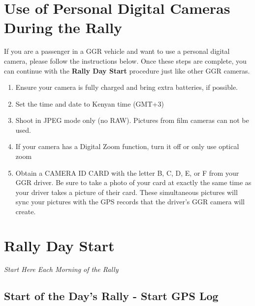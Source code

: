\section{Use of Personal Digital Cameras During the Rally}

If you are a passenger in a GGR vehicle and want to use a personal digital camera, please follow the instructions below.  Once these steps are complete, you can continue with the \textbf{Rally Day Start} procedure just like other GGR cameras.

\begin{enumerate}
    \item Ensure your camera is fully charged and bring extra batteries, if possible.
    \item Set the time and date to Kenyan time (GMT+3)
    \item Shoot in JPEG mode only (no RAW).  Pictures from film cameras can not be used.
    \item If your camera has a Digital Zoom function, turn it off or only use optical zoom
    \item Obtain a CAMERA ID CARD with the letter B, C, D, E, or F from your GGR driver.  Be sure to take a photo of your card at exactly the same time as your driver takes a picture of their card.  These simultaneous pictures will sync your pictures with the GPS records that the driver's GGR camera will create.
\end{enumerate}

\section{Rally Day Start}

\textit{Start Here Each Morning of the Rally}

\subsection{Start of the Day's Rally - Start GPS Log}

